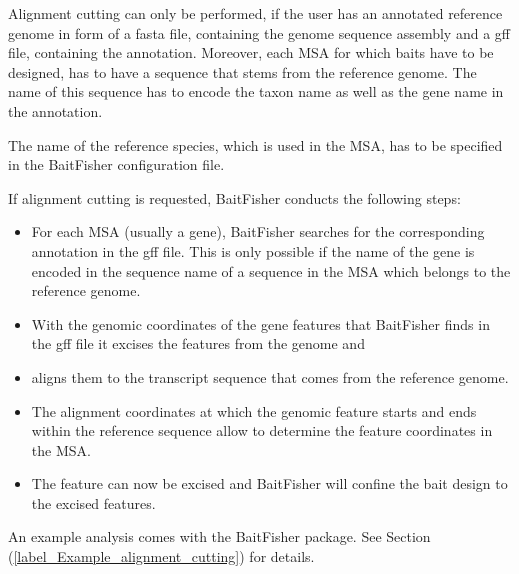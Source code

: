 \documentclass[a4paper,pdflatex,11pt]{article}
\begin{document}
Alignment cutting can only be performed, if the user has an annotated
reference genome in form of a fasta file, containing the genome sequence
assembly and a gff file, containing the annotation. Moreover, each MSA
for which baits have to be designed, has to have a sequence that stems
from the reference genome. The name of this sequence has to encode the
taxon name as well as the gene name in the annotation. 

The name of the reference species, which is used in the MSA, has to be specified in the BaitFisher configuration file.

If alignment cutting is requested, BaitFisher conducts the following steps:

\begin{itemize}
\item For each MSA (usually a gene), BaitFisher
searches for the corresponding annotation in the gff file.
This is only possible if the name of the gene is encoded in the sequence name of a sequence in the MSA which belongs to the reference genome.

\item With the genomic coordinates of the gene features that BaitFisher finds in the gff file it excises the features from the genome and 

\item aligns them to the transcript sequence that comes from the reference genome.
\item The alignment coordinates at which the genomic feature starts and ends within the reference sequence
allow to determine the feature coordinates in the MSA.
\item The feature can
now be excised and BaitFisher will confine the bait design to the excised features.
\end{itemize}

An example analysis comes with the BaitFisher package. See Section (\ref{label_Example_alignment_cutting})
for details.
\end{document}
